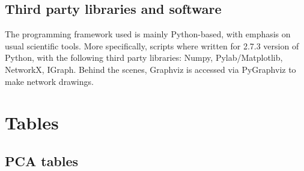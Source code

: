 \documentclass[%
 aip,
 jmp,%
 amsmath,amssymb,
 reprint,%
]{revtex4-1}
\begin{document}
\subsection{Third party libraries and software}
The programming framework used 
is mainly Python-based, with emphasis on usual
scientific tools. More specifically,
scripts where written for 2.7.3 version of Python,
with the following third party libraries: Numpy, Pylab/Matplotlib, NetworkX, IGraph.
Behind the scenes, Graphviz is accessed via PyGraphviz to make network drawings.
\clearpage
\section{Tables}\label{sectables}
\subsection{PCA tables}\label{sec:pcat}
%
\end{document}

